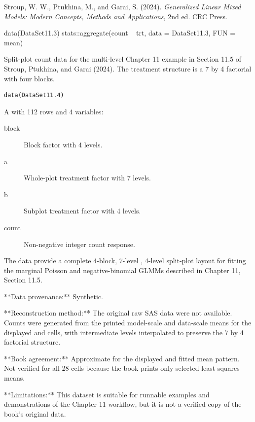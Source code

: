 \documentclass[a4paper]{book}
\begin{document}
%
\begin{References}
Stroup, W. W., Ptukhina, M., and Garai, S. (2024).
\emph{Generalized Linear Mixed Models: Modern Concepts, Methods and
Applications}, 2nd ed. CRC Press.
\end{References}
%
\begin{SeeAlso}
\end{SeeAlso}
%
\begin{Examples}
\begin{ExampleCode}
data(DataSet11.3)
stats::aggregate(count ~ trt, data = DataSet11.3, FUN = mean)
\end{ExampleCode}
\end{Examples}
%
\begin{Description}
Split-plot count data for the multi-level Chapter 11 example in
Section 11.5 of Stroup, Ptukhina, and Garai (2024). The treatment
structure is a 7 by 4 factorial with four blocks.
\end{Description}
%
\begin{Usage}
\begin{verbatim}
data(DataSet11.4)
\end{verbatim}
\end{Usage}
%
\begin{Format}
A  with 112 rows and 4 variables:
\begin{description}

\item[block] Block factor with 4 levels.
\item[a] Whole-plot treatment factor with 7 levels.
\item[b] Subplot treatment factor with 4 levels.
\item[count] Non-negative integer count response.

\end{description}

\end{Format}
%
\begin{Details}
The data provide a complete 4-block, 7-level , 4-level 
split-plot layout for fitting the marginal Poisson and negative-binomial
GLMMs described in Chapter 11, Section 11.5.

**Data provenance:** Synthetic.

**Reconstruction method:** The original raw SAS data were not available.
Counts were generated from the printed model-scale and data-scale means
for the displayed  and  cells, with intermediate
 levels interpolated to preserve the 7 by 4 factorial structure.

**Book agreement:** Approximate for the displayed  and
 fitted mean pattern. Not verified for all 28 cells because
the book prints only selected least-squares means.

**Limitations:** This dataset is suitable for runnable examples and
demonstrations of the Chapter 11 workflow, but it is not a verified copy
of the book's original  data.
\end{Details}
\end{document}
